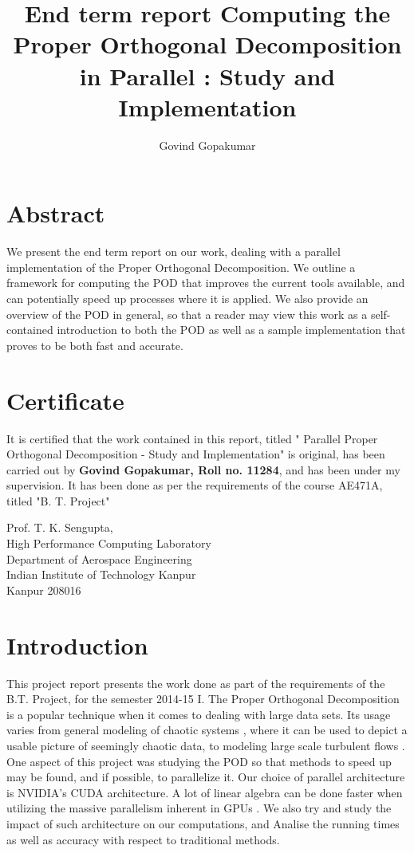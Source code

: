 \documentclass[submit]{aiaa-tc_mod}%
\title{End term report}
\title{ Computing the Proper Orthogonal Decomposition in Parallel : 
	 Study and Implementation}
\author{ Govind Gopakumar }
\begin{document}


\section*{Abstract}
We present the end term report on our work, dealing with a parallel implementation of the Proper Orthogonal Decomposition. We outline a framework for computing the POD that improves the current tools available, and can potentially speed up processes where it is applied. We also provide an overview of the POD in general, so that a reader may view this work as a self-contained introduction to both the POD as well as a sample implementation that proves to be both fast and accurate.


\clearpage

\section*{Certificate}

It is certified that the work contained in this report, titled " Parallel Proper Orthogonal Decomposition - Study and Implementation" is original, has been carried out by \textbf{Govind Gopakumar, Roll no. 11284}, and has been under my supervision. It has been done as per the requirements of the course AE471A, titled "B. T. Project"

\bigskip
\bigskip
\bigskip
\bigskip
\bigskip
\bigskip
\bigskip
\bigskip
\bigskip
\bigskip
\bigskip
\bigskip
\bigskip
\bigskip
\bigskip
\bigskip
\bigskip
\bigskip
\bigskip
\bigskip
\bigskip
\bigskip
\bigskip
\bigskip
\bigskip
\bigskip
\bigskip
\bigskip

\noindent Prof. T. K. Sengupta,\\
High Performance Computing Laboratory\\
Department of Aerospace Engineering\\
Indian Institute of Technology Kanpur\\
Kanpur 208016

\newpage
\tableofcontents
\newpage
\listoffigures
\newpage


\section{Introduction}

This project report presents the work done as part of the requirements of the B.T. Project, for the semester 2014-15 I. The Proper Orthogonal Decomposition \cite{iiscintro} is a popular technique when it comes to dealing with large data sets. Its usage varies from general modeling of chaotic systems \cite{sirovich}, where it can be used to depict a usable picture of seemingly chaotic data, to modeling large scale turbulent flows \cite{lumley}. One aspect of this project was studying the POD so that methods to speed up may be found, and if possible, to parallelize it. Our choice of parallel architecture is NVIDIA's CUDA architecture. A lot of linear algebra can be done faster when utilizing the massive parallelism inherent in GPUs \cite{gpufactorize}. We also try and study the impact of such architecture on our computations, and Analise the running times as well as accuracy with respect to traditional methods. 
\end{document}
